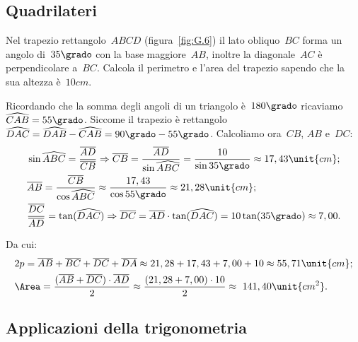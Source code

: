 
\subsection{Quadrilateri}
\label{subsec:trigo_quadrilateri}

 \begin{esempio}
Nel trapezio rettangolo~\(ABCD\) (figura~\ref{fig:G.6}) il lato obliquo~\(BC\) 
forma 
un angolo di~\(35\grado\) con la base maggiore~\(AB\), inoltre la diagonale~\(AC\)
è perpendicolare a~\(BC\). Calcola il perimetro e l'area del trapezio sapendo 
che 
la sua altezza è~\(10\unit{cm}\).

Ricordando che la somma degli angoli di un triangolo è~\(180\grado\) 
ricaviamo~\(\widehat{CAB}=55\grado\).
Siccome il trapezio è rettangolo
\(\widehat{DAC}=\widehat{DAB}-\widehat{CAB}=90\grado-55\grado\).
Calcoliamo ora~\(CB\), \(AB\) e~\(DC\):
\begin{align*}
&\sin \widehat{ABC} =\frac{\overline{AD}}{\overline{CB}} \Rightarrow 
\overline{CB}=\frac{\overline{AD}}{\sin \widehat{ABC}}=\frac{10}{\sin 35\grado
}\approx17,43\unit{cm};\\
&\overline{AB}=\frac{\overline{CB}}{\cos \widehat{ABC}}\approx\frac{17,43}{
\cos 55\grado}\approx21,28\unit{cm};\\
&\frac{\overline{DC}}{\overline{AD}}=\tan(\widehat{DAC}) \Rightarrow 
\overline{DC}=\overline{AD}\cdot\tan(\widehat{DAC})=10\tan(35\grado) \approx
7,00.
\end{align*}

Da cui:
\begin{align*}
&2p=\overline{AB}+\overline{BC}+\overline{DC}+\overline{DA} \approx
21,28+17,43+7,00+10\approx55,71\unit{cm};\\
&\Area=\frac{(\overline{AB}+\overline{DC})\cdot\overline{AD}}{2} \approx
\frac{(21,28+7,00)\cdot 10}{2}\approx~141,40\unit{cm^2}.
\end{align*}
 \end{esempio}


\subsection{Applicazioni della trigonometria}
\label{subsec:trigo_applicazioni}

